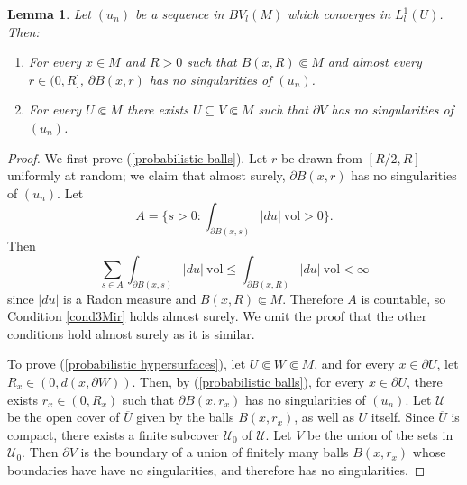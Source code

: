 \documentclass[reqno,12pt,letterpaper]{amsart}
\newcommand{\NN}{\mathbf{N}}
\newcommand{\vol}{\mathrm{vol}}
\newtheorem{lemma}[theorem]{Lemma}
\theoremstyle{definition}
\numberwithin{equation}{section}
\begin{document}
\begin{lemma}\label{probabilistic method}
Let $(u_n)$ be a sequence in $BV_l(M)$ which converges in $L^1_l(U)$. Then:
\begin{enumerate}
\item \label{probabilistic balls} For every $x \in M$ and $R > 0$ such that $B(x, R) \Subset M$ and almost every $r \in (0, R]$, $\partial B(x, r)$ has no singularities of $(u_n)$.
\item \label{probabilistic hypersurfaces} For every $U \Subset M$ there exists $U \subseteq V \Subset M$ such that $\partial V$ has no singularities of $(u_n)$.
\end{enumerate}
\end{lemma}
\begin{proof}
We first prove (\ref{probabilistic balls}).
Let $r$ be drawn from $[R/2, R]$ uniformly at random; we claim that almost surely, $\partial B(x, r)$ has no singularities of $(u_n)$.
Let
$$A = \{s > 0: \int_{\partial B(x, s)} |du| ~\vol > 0\}.$$
Then
$$\sum_{s \in A} \int_{\partial B(x, s)} |du| ~\vol \leq \int_{\partial B(x, R)} |du| ~\vol < \infty$$
since $|du|$ is a Radon measure and $B(x, R) \Subset M$.
Therefore $A$ is countable,
so Condition \ref{cond3Mir} holds almost surely.
We omit the proof that the other conditions hold almost surely as it is similar.

To prove (\ref{probabilistic hypersurfaces}), let $U \Subset W \Subset M$, and for every $x \in \partial U$, let $R_x \in (0, d(x, \partial W))$.
Then, by (\ref{probabilistic balls}), for every $x \in \partial U$, there exists $r_x \in (0, R_x)$ such that $\partial B(x, r_x)$ has no singularities of $(u_n)$.
Let $\mathcal U$ be the open cover of $\overline U$ given by the balls $B(x, r_x)$, as well as $U$ itself.
Since $\overline U$ is compact, there exists a finite subcover $\mathcal U_0$ of $\mathcal U$.
Let $V$ be the union of the sets in $\mathcal U_0$.
Then $\partial V$ is the boundary of a union of finitely many balls $B(x, r_x)$ whose boundaries have have no singularities, and therefore has no singularities.
\end{proof}
\end{document}
